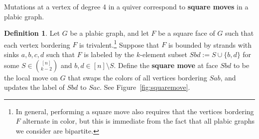 \documentclass[11pt]{article}
\theoremstyle{definition}
\newtheorem{defi}[theo]{Definition}
\numberwithin{equation}{section}
\numberwithin{equation}{section}
\begin{document}
Mutations at a vertex of degree 4 in a quiver correspond to \textbf{square moves} in a plabic graph.
\begin{defi}\label{definition:squaremove}
Let $G$ be a plabic graph, and let $F$ be a square face of $G$ such that each vertex bordering $F$ is trivalent.\footnote{In general, performing a square move also requires that the vertices bordering $F$ alternate in color, but this is immediate from the fact that all plabic graphs we consider are bipartite.} Suppose that $F$ is bounded by strands with sinks $a,b,c,d$ such that $F$ is labeled by the $k$-element subset $Sbd := S \cup \{b,d\}$ for some $S \in \binom{[n]}{k-2}$ and $b,d \in [n] \setminus S$. Define the \textbf{square move} at face $Sbd$ to be the local move on $G$ that swaps the colors of all vertices bordering $Sab$, and updates the label of $Sbd$ to $Sac$. See Figure~\ref{fig:squaremove}.
\begin{figure}
\centering
\begin{tikzpicture}[x=0.5pt,y=0.5pt,yscale=-1,xscale=1]


\end{tikzpicture}
\end{figure}
\end{defi}
\end{document}
